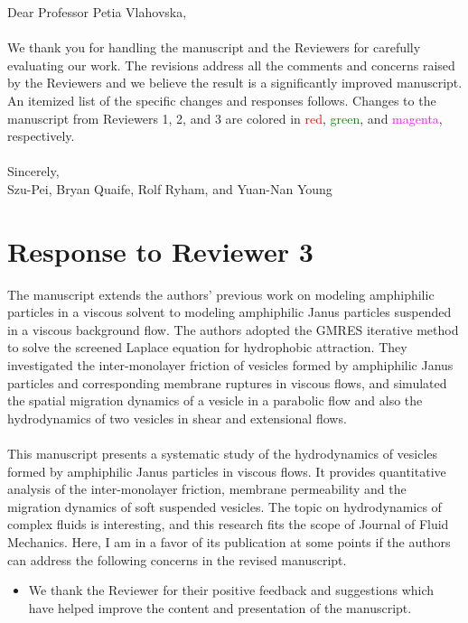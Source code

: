 \documentclass[11pt]{article}
\newcommand{\comment}[1]{{\color{blue} #1}}
\begin{document}
\noindent
Dear Professor Petia Vlahovska,
\\ \\
\noindent
We thank you for handling the manuscript and the Reviewers for carefully
evaluating our work. The revisions address all the comments and
concerns raised by the Reviewers and we believe the result is a
significantly improved manuscript. An itemized list of the specific
changes and responses follows. Changes to the manuscript from Reviewers
1, 2, and 3 are colored in \textcolor{red}{red},
\textcolor{green}{green}, and \textcolor{magenta}{magenta},
respectively. \\ \\
\noindent
Sincerely,
\\
\noindent
Szu-Pei, Bryan Quaife, Rolf Ryham, and Yuan-Nan Young

\section*{Response to Reviewer 3}
\comment{\noindent
The manuscript extends the authors’ previous work on modeling
amphiphilic particles in a viscous solvent to modeling amphiphilic Janus
particles suspended in a viscous background flow. The authors adopted
the GMRES iterative method to solve the screened Laplace equation for
hydrophobic attraction. They investigated the inter-monolayer friction
of vesicles formed by amphiphilic Janus particles and corresponding
membrane ruptures in viscous flows, and simulated the spatial migration
dynamics of a vesicle in a parabolic flow and also the hydrodynamics of
two vesicles in shear and extensional flows.
\\ \\
\noindent
This manuscript presents a systematic study of the hydrodynamics of
vesicles formed by amphiphilic Janus particles in viscous flows. It
provides quantitative analysis of the inter-monolayer friction, membrane
permeability and the migration dynamics of soft suspended vesicles. The
topic on hydrodynamics of complex fluids is interesting, and this
research fits the scope of Journal of Fluid Mechanics. Here, I am in a
favor of its publication at some points if the authors can address the
following concerns in the revised manuscript.
}
\begin{itemize}
\item We thank the Reviewer for their positive feedback
  and suggestions which have helped improve the content and presentation
    of the manuscript.
\end{itemize}
\end{document}
